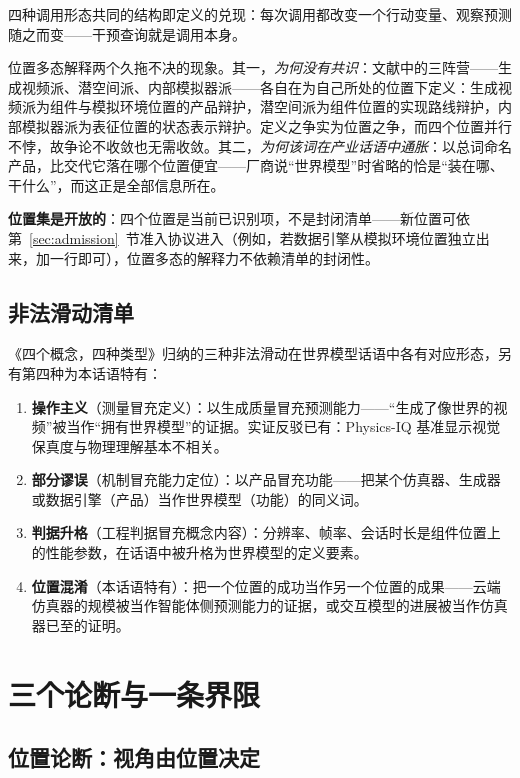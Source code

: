 \documentclass[10pt,fontset=fandol]{ctexart}
\begin{document}
四种调用形态共同的结构即定义的兑现：每次调用都改变一个行动变量、观察预测随之而变——干预查询就是调用本身。

位置多态解释两个久拖不决的现象。其一，\emph{为何没有共识}：文献中的三阵营——生成视频派\cite{openai2024sora}、潜空间派\cite{lecun2022path}、内部模拟器派\cite{chen2026definition}——各自在为自己所处的位置下定义：生成视频派为组件与模拟环境位置的产品辩护，潜空间派为组件位置的实现路线辩护，内部模拟器派为表征位置的状态表示辩护。定义之争实为位置之争，而四个位置并行不悖，故争论不收敛也无需收敛。其二，\emph{为何该词在产业话语中通胀}：以总词命名产品，比交代它落在哪个位置便宜——厂商说“世界模型”时省略的恰是“装在哪、干什么”，而这正是全部信息所在。

\textbf{位置集是开放的}：四个位置是当前已识别项，不是封闭清单——新位置可依第~\ref{sec:admission}~节准入协议进入（例如，若数据引擎从模拟环境位置独立出来，加一行即可），位置多态的解释力不依赖清单的封闭性。

\subsection{非法滑动清单}\label{sec:slips}

《四个概念，四种类型》\cite{yu2026fourconcepts}归纳的三种非法滑动在世界模型话语中各有对应形态，另有第四种为本话语特有：

\begin{enumerate}
\item \textbf{操作主义}（测量冒充定义）：以生成质量冒充预测能力——“生成了像世界的视频”被当作“拥有世界模型”的证据。实证反驳已有：Physics-IQ 基准显示视觉保真度与物理理解基本不相关\cite{motamed2025physicsiq}。
\item \textbf{部分谬误}（机制冒充能力定位）：以产品冒充功能——把某个仿真器、生成器或数据引擎（产品）当作世界模型（功能）的同义词。
\item \textbf{判据升格}（工程判据冒充概念内容）：分辨率、帧率、会话时长是组件位置上的性能参数，在话语中被升格为世界模型的定义要素。
\item \textbf{位置混淆}（本话语特有）：把一个位置的成功当作另一个位置的成果——云端仿真器的规模被当作智能体侧预测能力的证据，或交互模型的进展被当作仿真器已至的证明。
\end{enumerate}

\section{三个论断与一条界限}\label{sec:propositions}

\subsection{位置论断：视角由位置决定}\label{sec:positionth}
\end{document}
